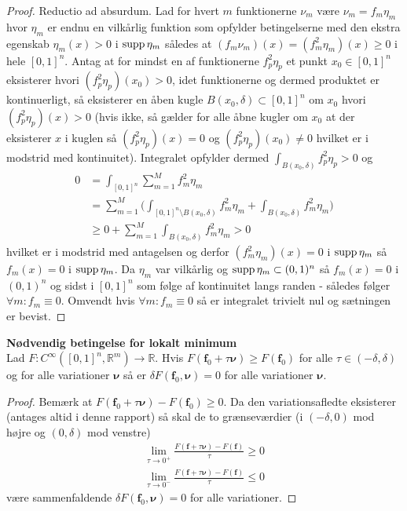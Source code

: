 \begin{proof} Reductio ad absurdum. Lad for hvert $m$ funktionerne $\nu_m $ være $\nu_m = f_m \eta_m$ hvor $\eta_m$ er endnu en vilkårlig funktion som opfylder betingelserne med den ekstra egenskab $\eta_m(x) >0$ i $\textnormal{supp}\, \eta_m$ således at $(f_m \nu_m)(x) = (f^2_m \eta_m)(x) \geq 0$ i hele $[0,1]^n$. Antag at for mindst en af funktionerne $f^2_p \eta_p$ et punkt $x_0 \in [0,1]^n$  eksisterer hvori $(f^2_p \eta_p)(x_0)>0$, idet funktionerne og dermed produktet er kontinuerligt, så eksisterer en åben kugle $B(x_0,\delta) \subset [0,1]^n$ om $x_0$ hvori $(f^2_p \eta_p)(x)>0$ (hvis ikke, så gælder for alle åbne kugler om $x_0$ at der eksisterer $x$ i kuglen så $(f^2_p \eta_p)(x)=0$ og $(f^2_p \eta_p)(x_0) \neq 0$ hvilket er i modstrid med kontinuitet). Integralet opfylder dermed $\int_{ B(x_0,\delta)} f^2_p \eta_p > 0$ og
\begin{align*}
0&=\int_{[0,1]^n} \sum_{m=1}^M f^2_m \eta_m  \\
&=\sum_{m=1}^M \Big(\int_{[0,1]^n\setminus B(x_0,\delta)}f^2_m \eta_m + \int_{ B(x_0,\delta)} f^2_m \eta_m \Big) \\
&\geq 0+\sum_{m=1}^M\int_{ B(x_0,\delta)} f^2_m \eta_m > 0
\end{align*}
hvilket er i modstrid med antagelsen og derfor $(f^2_m \eta_m)(x)= 0$ i $\textnormal{supp}\, \eta_m$ så $f_m(x) = 0$ i $\textnormal{supp}\, \eta_m$. Da $\eta_m$ var vilkårlig og $\textnormal{supp}\, \eta_m \subset (0,1)^n$ så $f_m(x) = 0$ i $(0,1)^n$ og sidst i $[0,1]^n$ som følge af kontinuitet langs randen - således følger $\forall m : f_m \equiv 0$. Omvendt hvis $\forall m : f_m \equiv 0$ så er integralet trivielt nul og sætningen er bevist.
\end{proof}


\begin{thm} {\bf Nødvendig betingelse for lokalt minimum}\\
Lad $F : C^\infty ([0,1]^n, \mathbb{R}^m) \to \mathbb{R}$. Hvis $F(\mathbf{f}_0+\tau {\boldsymbol \nu}) \geq F(\mathbf{f}_0)$ for alle $\tau\in (-\delta, \delta)$ og for alle variationer ${\boldsymbol \nu}$ så er $\delta F(\mathbf{f}_0, {\boldsymbol \nu})=0$ for alle variationer ${\boldsymbol \nu}$.
\end{thm}
\begin{proof} Bemærk at $F(\mathbf{f}_0+\tau {\boldsymbol \nu}) - F(\mathbf{f}_0) \geq 0$. Da den variationsafledte eksisterer (antages altid i denne rapport) så skal de to grænseværdier (i $(-\delta,0)$ mod højre og $(0,\delta)$ mod venstre)
\begin{align*}
\lim_{\tau \to 0^+} \frac{F(\mathbf{f}+\tau{\boldsymbol \nu})-F(\mathbf{f})}{\tau} \geq 0 \\
\lim_{\tau \to 0^-} \frac{F(\mathbf{f}+\tau{\boldsymbol \nu})-F(\mathbf{f})}{\tau} \leq 0
\end{align*}
være sammenfaldende $\delta F(\mathbf{f}_0, {\boldsymbol \nu})=0$ for alle variationer.
\end{proof}




